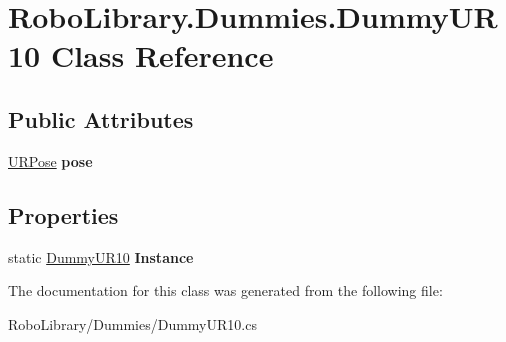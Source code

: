 \hypertarget{class_robo_library_1_1_dummies_1_1_dummy_u_r10}{}\section{Robo\+Library.\+Dummies.\+Dummy\+U\+R10 Class Reference}
\label{class_robo_library_1_1_dummies_1_1_dummy_u_r10}
\subsection*{Public Attributes}
\begin{DoxyCompactItemize}
\item 
\hypertarget{class_robo_library_1_1_dummies_1_1_dummy_u_r10_a76a637158c69bcf680651946af7b66d8}{}\label{class_robo_library_1_1_dummies_1_1_dummy_u_r10_a76a637158c69bcf680651946af7b66d8} 
\hyperlink{class_robo_library_1_1_u_r_pose}{U\+R\+Pose} {\bfseries pose}
\end{DoxyCompactItemize}
\subsection*{Properties}
\begin{DoxyCompactItemize}
\item 
\hypertarget{class_robo_library_1_1_dummies_1_1_dummy_u_r10_a68900145db5334b73384ab45ede80ba5}{}\label{class_robo_library_1_1_dummies_1_1_dummy_u_r10_a68900145db5334b73384ab45ede80ba5} 
static \hyperlink{class_robo_library_1_1_dummies_1_1_dummy_u_r10}{Dummy\+U\+R10} {\bfseries Instance}
\end{DoxyCompactItemize}


The documentation for this class was generated from the following file\+:\begin{DoxyCompactItemize}
\item 
Robo\+Library/\+Dummies/Dummy\+U\+R10.\+cs\end{DoxyCompactItemize}
